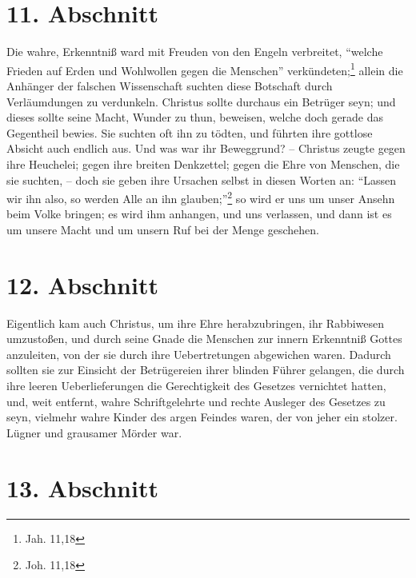 \section{11. Abschnitt}

Die wahre, Erkenntniß ward mit Freuden von den Engeln verbreitet,  "`welche Frieden auf Erden und Wohlwollen gegen die Menschen"'  verkündeten;\footnote{Jah. 11,18} allein die Anhänger der falschen Wissenschaft suchten diese Botschaft durch Verläumdungen zu verdunkeln. Christus sollte durchaus ein Betrüger seyn; und dieses sollte seine Macht, Wunder zu thun, beweisen, welche doch gerade das Gegentheil bewies. Sie suchten oft ihn zu tödten, und führten ihre gottlose Absicht auch endlich aus. Und was war ihr Beweggrund? -- Christus zeugte gegen ihre Heuchelei; gegen ihre breiten Denkzettel; gegen die Ehre von Menschen, die sie suchten, -- doch sie geben ihre Ursachen selbst in diesen Worten an: "`Lassen wir ihn also, so werden Alle an ihn glauben;"'\footnote{Joh. 11,18} so wird er uns um unser Ansehn beim Volke bringen; es wird ihm anhangen, und uns verlassen, und dann ist es um unsere Macht und um unsern Ruf bei der Menge geschehen.

\section{12. Abschnitt}

Eigentlich kam auch Christus, um ihre Ehre herabzubringen, ihr Rabbiwesen umzustoßen, und durch seine Gnade die Menschen zur innern Erkenntniß Gottes anzuleiten, von der sie durch ihre Uebertretungen abgewichen waren. Dadurch sollten sie zur Einsicht der Betrügereien ihrer blinden Führer gelangen, die durch ihre leeren Ueberlieferungen die Gerechtigkeit des Gesetzes vernichtet hatten, und, weit entfernt, wahre Schriftgelehrte und rechte Ausleger des Gesetzes zu seyn, vielmehr wahre Kinder des argen Feindes waren, der von jeher ein stolzer. Lügner und grausamer Mörder war.

\section{13. Abschnitt}

